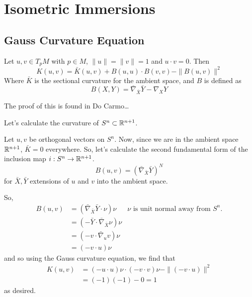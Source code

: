 \documentclass[../main.tex]{subfiles}
\begin{document}
\section{Isometric Immersions}
\subsection{Gauss Curvature Equation}

\begin{theorem}
    Let $u,v\in T_pM$ with $p\in M$, $\|u\|=\|v\| = 1$ and $u\cdot v=0$. Then
    \begin{equation}
        K(u,v) = \bar{K}(u,v) + B(u,u)\cdot B(v,v) - \|B(u,v)\|^2
        \label{Gauss Curvature Equation}
    \end{equation}
    Where $\bar{K}$ is the sectional curvature for the ambient space, and $B$ is
    defined as
    \begin{equation}
        B(X,Y) = \bar{\nabla}_{\bar{X}}\bar{Y} - \nabla_XY
    \end{equation}
\end{theorem}
The proof of this is found in Do Carmo\ldots

\begin{ex}
    Let's calculate the curvature of $S^n\subset \mathbb{R}^{n+1}$.

    Let $u,v$ be orthogonal vectors on $S^n$. Now, since we are in the ambient
    space $\mathbb{R}^{n+1}$, $\bar{K}=0$ everywhere. So, let's calculate the second
    fundamental form of the inclusion map $i:S^n\to \mathbb{R}^{n+1}$.
    \[
    B(u,v) = (\bar{\nabla}_{\bar{X}}\bar{Y})^N
    \]
    for $\bar{X},\bar{Y}$ extensions of $u$ and $v$ into the ambient space.

    So,
    \[
\begin{aligned}
B(u,v) &= (\bar{\nabla}_{\bar{X}}\bar{Y}\cdot \nu)\nu &\text{$\nu$ is unit
normal away from $S^n$.}\\
&=(-\bar{Y}\cdot\bar{\nabla}_{\bar{X}}\nu)\nu\\
&= (-v\cdot \bar{\nabla}_u v)\nu\\
&= (-v\cdot u)\nu
\end{aligned}
    \]
    and so using the Gauss curvature equation, we find that 
    \[
\begin{aligned}
    K(u,v) &= (-u\cdot u)\nu\cdot(-v\cdot v)\nu -\|(-v\cdot u)\|^2\\
    &= (-1)(-1)-0 = 1
\end{aligned}
    \]
    as desired.
\end{ex}
\end{document}
